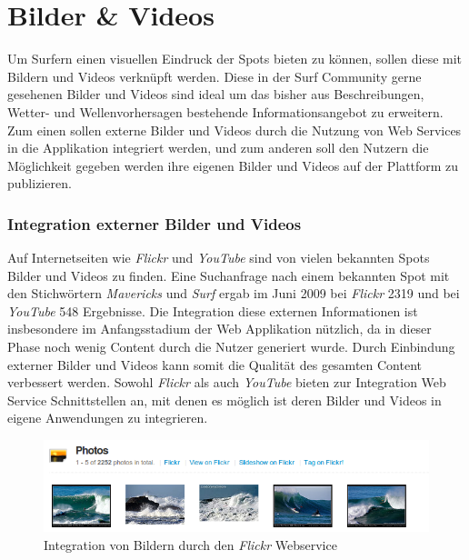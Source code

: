 \section{Bilder \& Videos}
Um Surfern einen visuellen Eindruck der Spots bieten zu können, sollen
diese mit Bildern und Videos verknüpft werden. Diese in der Surf
Community gerne gesehenen Bilder und Videos sind ideal um das bisher
aus Beschreibungen, Wetter- und Wellenvorhersagen bestehende
Informationsangebot zu erweitern. Zum einen sollen externe Bilder und
Videos durch die Nutzung von Web Services in die Applikation
integriert werden, und zum anderen soll den Nutzern die Möglichkeit
gegeben werden ihre eigenen Bilder und Videos auf der Plattform zu
publizieren.

\subsubsection{Integration externer Bilder und Videos}
Auf Internetseiten wie \textit{Flickr} und \textit{YouTube} sind von
vielen bekannten Spots Bilder und Videos zu finden. Eine Suchanfrage
nach einem bekannten Spot mit den Stichwörtern \textit{Mavericks} und
\textit{Surf} ergab im Juni 2009 bei \textit{Flickr} 2319 und bei
\textit{YouTube} 548 Ergebnisse. Die Integration diese externen
Informationen ist insbesondere im Anfangsstadium der Web Applikation
nützlich, da in dieser Phase noch wenig Content durch die Nutzer
generiert wurde. Durch Einbindung externer Bilder und Videos kann
somit die Qualität des gesamten Content verbessert werden. Sowohl
\textit{Flickr} als auch \textit{YouTube} bieten zur Integration Web
Service Schnittstellen an, mit denen es möglich ist deren Bilder und
Videos in eigene Anwendungen zu integrieren.

\begin{figure}[h]
  \begin{center}
    \includegraphics[width=\textwidth]{bilder/photos-flickr}
    \caption{Integration von Bildern durch den \textit{Flickr}
      Webservice}
    \label{piktogramm}
  \end{center}
\end{figure}

